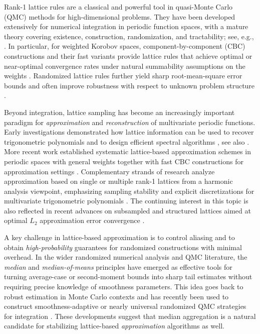 \documentclass[a4paper,11pt]{article}
\begin{document}
Rank-1 lattice rules are a classical and powerful tool in quasi-Monte Carlo (QMC) methods for high-dimensional problems. They have been developed extensively for numerical integration in periodic function spaces, with a mature theory covering existence, construction, randomization, and tractability; see, e.g., \cite{DKP22,DKS13,N92,SJ94}. In particular, for weighted Korobov spaces, component-by-component (CBC) constructions and their fast variants provide lattice rules that achieve optimal or near-optimal convergence rates under natural summability assumptions on the weights \cite{D04,DG21,DSWW06,K03,NC06,SR02}. Randomized lattice rules further yield sharp root-mean-square error bounds and often improve robustness with respect to unknown problem structure \cite{DGS22,G26,GK26,KKNU19,KNW23}.

Beyond integration, lattice sampling has become an increasingly important paradigm for \emph{approximation} and \emph{reconstruction} of multivariate periodic functions. Early investigations demonstrated how lattice information can be used to recover trigonometric polynomials and to design efficient spectral algorithms \cite{KSW06,LH03}, see also \cite{HW63}. More recent work established systematic lattice-based approximation schemes in periodic spaces with general weights together with fast CBC constructions for approximation settings \cite{CKNS20,CKNS21,KMNN21}. Complementary strands of research analyze approximation based on single or multiple rank-1 lattices from a harmonic analysis viewpoint, emphasizing sampling stability and explicit discretizations for multivariate trigonometric polynomials \cite{BKTV17,K19,KPV15,KV19}. The continuing interest in this topic is also reflected in recent advances on subsampled and structured lattices aimed at optimal $L_2$ approximation error convergence \cite{BGKS24}.

A key challenge in lattice-based approximation is to control aliasing and to obtain \emph{high-probability} guarantees for randomized constructions with minimal overhead. In the wider randomized numerical analysis and QMC literature, the \emph{median} and \emph{median-of-means} principles have emerged as effective tools for turning average-case or second-moment bounds into sharp tail estimates without requiring precise knowledge of smoothness parameters. This idea goes back to robust estimation in Monte Carlo contexts \cite{KNR19,NP09} and has recently been used to construct smoothness-adaptive or nearly universal randomized QMC strategies for integration \cite{GK26,GL22,GSM24,P26,PO23,PO24}. These developments suggest that median aggregation is a natural candidate for stabilizing lattice-based \emph{approximation} algorithms as well.
\end{document}
